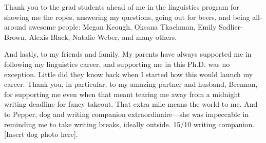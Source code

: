 Thank you to the grad students ahead of me in the linguistics program for showing me the ropes, answering my questions, going out for beers, and being all-around awesome people: Megan Keough, Oksana Tkachman, Emily Sadlier-Brown, Alexis Black, Natalie Weber, and many others.

And lastly, to my friends and family. My parents have always supported me in following my linguistics career, and supporting me in this Ph.D. was no exception. Little did they know back when I started how this would launch my career. Thank you, in particular, to my amazing partner and husband, Brennan, for supporting me even when that meant tearing me away from a midnight writing deadline for fancy takeout. That extra mile means the world to me. And to Pepper, dog and writing companion extraordinaire---she was impeccable in reminding me to take writing breaks, ideally outside. 15/10 writing companion. [Insert dog photo here].

\endinput %
